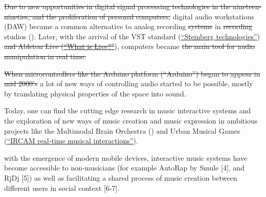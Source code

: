  \st{Due to new opportunities in digital signal processing technologies in the nineteen-nineties, and the proliferation of personal computers,} digital audio workstations (DAW) became a common alternative to analog recording  \st{systems} in \st{recording} studios (). Later, with the arrival of the VST standard (\href{http://www.steinberg.net/en/company/technologies.html}{``Steinberg technologies''}) \st{and Ableton Live (}\href{https://www.ableton.com/en/live/}{\st{``What is Live?''}}), computers became  \st{the main tool for audio manipulation in real time.} \href{https://www.ableton.com/en/live/}{} 

\st{When microcontrollers like the Arduino platform (``Arduino'') began to appear in mid 2000's} a lot of new ways of controlling audio started to be possible, mostly by translating physical properties of the space into sound.

Today, one can find the cutting edge research in music interactive systems and the exploration of new ways of music creation and music expression in ambitious projects like the Multimodal Brain Orchestra (\href{http://specs.upf.edu/installation/2025}{}) and Urban Musical Games (\href{http://imtr.ircam.fr/imtr/IRCAM_Real-Time_Musical_Interactions}{``IRCAM real-time musical interactions''}).

with the emergence of modern mobile devices, interactive music systems have become accessible to non-musicians (for example AutoRap by Smule [4], and RjDj [5]) as well as facilitating a shared process of music creation between different users in social context [6-7].


